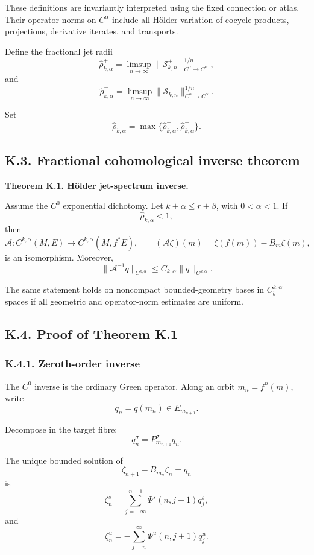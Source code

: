 \documentclass[12pt,a4paper]{article}
\theoremstyle{plain}
\numberwithin{equation}{section}
\numberwithin{theorem}{section}
\begin{document}
These definitions are invariantly interpreted using the fixed connection or atlas. Their operator norms on $C^\alpha$ include all H\"older variation of cocycle products, projections, derivative iterates, and transports.

Define the fractional jet radii
\[
\widehat\rho_{k,\alpha}^+
=
\limsup_{n\to\infty}
\|\mathcal S_{k,n}^+\|_{C^\alpha\to C^\alpha}^{1/n},
\]
and
\[
\widehat\rho_{k,\alpha}^-
=
\limsup_{n\to\infty}
\|\mathcal S_{k,n}^-\|_{C^\alpha\to C^\alpha}^{1/n}.
\]

Set
\[
\widehat\rho_{k,\alpha}
=
\max\{
\widehat\rho_{k,\alpha}^+,
\widehat\rho_{k,\alpha}^-
\}.
\]

\subsection{K.3. Fractional cohomological inverse theorem}

\textbf{Theorem K.1. H\"older jet-spectrum inverse.}

Assume the $C^0$ exponential dichotomy. Let $k+\alpha\le r+\beta$, with $0<\alpha<1$. If
\[
\widehat\rho_{k,\alpha}<1,
\]
then
\[
\mathcal A:
C^{k,\alpha}(M,E)
\to
C^{k,\alpha}(M,f^*E),
\qquad
(\mathcal A\zeta)(m)=
\zeta(f(m))-B_m\zeta(m),
\]
is an isomorphism. Moreover,
\[
\|\mathcal A^{-1}q\|_{C^{k,\alpha}}
\le
C_{k,\alpha}
\|q\|_{C^{k,\alpha}}.
\]

The same statement holds on noncompact bounded-geometry bases in $C_b^{k,\alpha}$ spaces if all geometric and operator-norm estimates are uniform.

\subsection{K.4. Proof of Theorem K.1}

\subsubsection{K.4.1. Zeroth-order inverse}

The $C^0$ inverse is the ordinary Green operator. Along an orbit $m_n=f^n(m)$, write
\[
q_n=q(m_n)\in E_{m_{n+1}}.
\]

Decompose in the target fibre:
\[
q_n^\sigma=P_{m_{n+1}}^\sigma q_n.
\]

The unique bounded solution of
\[
\zeta_{n+1}-B_{m_n}\zeta_n=q_n
\]
is
\[
\zeta_n^s
=
\sum_{j=-\infty}^{n-1}
\Phi^s(n,j+1)q_j^s,
\]
and
\[
\zeta_n^u
=
-
\sum_{j=n}^{\infty}
\Phi^u(n,j+1)q_j^u.
\]
\end{document}
